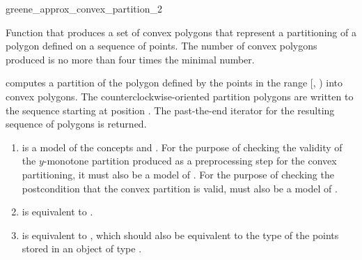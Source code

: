 \begin{ccRefFunction}{greene_approx_convex_partition_2}

\ccDefinition
Function that produces a set of 
convex polygons that represent a partitioning of a polygon defined
on a sequence of points.
The number of convex polygons produced is 
no more than four times the minimal number.%


{
computes a partition of the polygon defined 
by the points in the range [, ) into convex 
polygons. The counterclockwise-oriented partition polygons are written to
the sequence starting at position .  The past-the-end iterator for 
the resulting sequence of polygons is returned.
\ccPrecond{The points in the range [\ccc{first}, \ccc{beyond}) define a simple,
counterclockwise-oriented polygon.}
}

\begin{enumerate}
    \item {} is a model of the concepts 
          and .
          For the purpose of 
          checking the validity of the $y$-monotone partition produced as
          a preprocessing step for the convex partitioning, it must also 
          be a model of .
          For the purpose of checking
          the postcondition that the convex partition is valid, 
          must also be a model of .
    \item {} is equivalent to 
          .
    \item {} is equivalent to 
          ,
          which should also be equivalent to the type of the points stored in 
          an object of type .
\end{enumerate}


\end{ccRefFunction}
